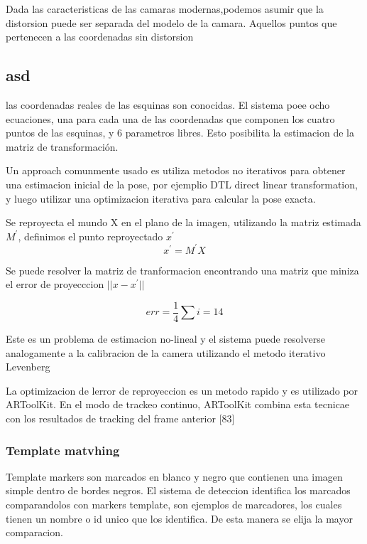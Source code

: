 \documentclass[runningheads]{llncs}
\begin{document}
	Dada las caracteristicas de las camaras modernas,podemos asumir que la distorsion puede ser separada del modelo de la camara. Aquellos puntos que pertenecen a las coordenadas sin distorsion %

\subsection{asd}
las coordenadas reales de las esquinas son conocidas. El sistema poee ocho ecuaciones, una para cada una de las coordenadas que componen los cuatro puntos de las esquinas, y 6 parametros libres. Esto posibilita la estimacion de la matriz de transformación.

Un approach comunmente usado es utiliza metodos no iterativos para obtener una estimacion inicial de la pose, por ejemplio DTL direct linear transformation, y luego utilizar una optimizacion iterativa para calcular la pose exacta.

Se reproyecta el mundo X en el plano de la imagen, utilizando la matriz estimada $M^{'}$, definimos el punto reproyectado $x^{'}$
\begin{equation}
x^{'}= M^{'}X
\end{equation}

Se puede resolver la matriz de tranformacion encontrando una matriz que miniza el error de proyecccion $||x - x^{'}||$ 

\begin{equation}
err = \frac{1}{4} \sum {i=1}{4}
\end{equation}

Este es un problema de estimacion no-lineal y el sistema puede resolverse analogamente a la calibracion de la camera utilizando el metodo iterativo Levenberg

La optimizacion de lerror de reproyeccion es un metodo rapido y es utilizado por ARToolKit. En el modo de trackeo continuo, ARToolKit combina esta tecnicae con los resultados de tracking del frame anterior [83]

\subsubsection{Template matvhing}
Template markers son marcados en blanco y negro que contienen una imagen simple dentro de bordes negros. El sistema de deteccion identifica los marcados comparandolos con markers template, son ejemplos de marcadores, los cuales tienen un nombre o id unico que los identifica. De esta manera se elija la mayor comparacion.
\end{document}
